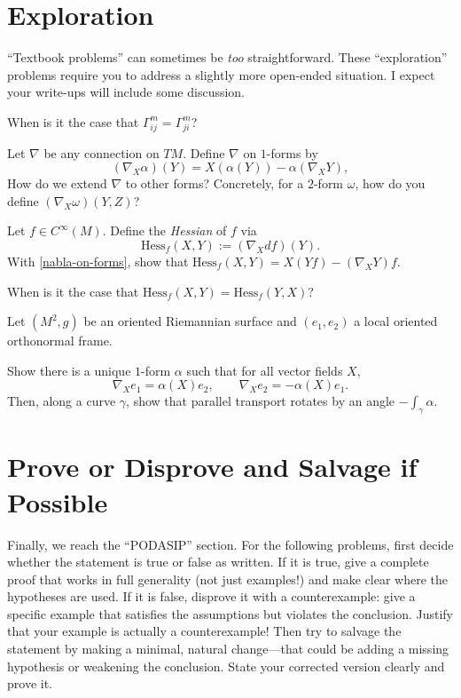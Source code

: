 \documentclass{homework}
\begin{document}
\section{Exploration}

{\footnotesize ``Textbook problems'' can sometimes be \textit{too} straightforward. These ``exploration'' problems require you to address a slightly more open-ended situation. I expect your write-ups will include some discussion.}

\begin{problem}
When is it the case that $\Gamma^m_{ij}=\Gamma^m_{ji}$?
\end{problem}

\begin{problem}\label{nabla-on-forms}
Let $\nabla$ be any connection on $TM$. Define $\nabla$ on $1$-forms by
\[
(\nabla_X\alpha)(Y)=X(\alpha(Y))-\alpha(\nabla_XY),
\]
How do we extend $\nabla$ to other forms? Concretely, for a $2$-form $\omega$, 
how do you define $(\nabla_X \omega)(Y,Z)$?
\end{problem}


\begin{problem}
Let $f\in C^\infty(M)$. Define the \emph{Hessian} of $f$ via
\[
\mathrm{Hess}_f(X,Y):=(\nabla_X df)(Y).
\]
With \ref{nabla-on-forms}, show that $\mathrm{Hess}_f(X,Y)=X(Yf)-(\nabla_XY)f$.

When is it the case that $\mathrm{Hess}_f(X,Y)=\mathrm{Hess}_f(Y,X)$?
\end{problem}

\begin{problem}
Let $(M^2,g)$ be an oriented Riemannian surface and $(e_1,e_2)$ a local oriented orthonormal frame.

Show there is a unique $1$-form $\alpha$ such that for all vector fields $X$,
\[
\nabla_X e_1=\alpha(X)e_2,\qquad \nabla_X e_2=-\alpha(X)e_1.
\]
Then, along a curve $\gamma$, show that parallel transport rotates by an angle $-\int_\gamma \alpha$.
\end{problem}

\section{Prove or Disprove and Salvage if Possible}

{\footnotesize Finally, we reach the ``PODASIP'' section. For the following problems, first decide whether the statement is true or false as written. If it is true, give a complete proof that works in full generality (not just examples!) and make clear where the hypotheses are used. If it is false, disprove it with a counterexample: give a specific example that satisfies the assumptions but violates the conclusion. Justify that your example is actually a counterexample! Then try to salvage the statement by making a minimal, natural change---that could be adding a missing hypothesis or weakening the conclusion. State your corrected version clearly and prove it.}
\end{document}
